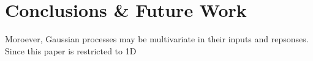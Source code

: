 \section{Conclusions \& Future Work}
\label{conclusion}

Moroever, Gaussian processes may be multivariate in their inputs and repsonses. 
Since this paper is restricted to 1D
